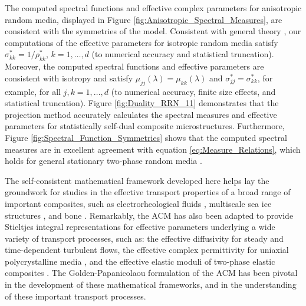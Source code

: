\documentclass{cmslatex}
\renewcommand{\theequation}{\arabic{section}.\arabic{equation}}
\begin{document}
The computed spectral functions and effective complex parameters for
anisotropic random media, displayed in Figure
\ref{fig:Anisotropic_Spectral_Measures},  are consistent with the
symmetries of the model. Consistent with general theory
\cite{MILTON:2002:TC}, our computations of the effective parameters
for isotropic random media 
satisfy $\sigma^*_{kk}=1/\rho^*_{kk}$, $k=1,\ldots,d$ (to numerical accuracy and
statistical truncation). Moreover, the computed spectral functions and
effective parameters are consistent with isotropy and satisfy
$\mu_{jj}(\lambda)=\mu_{kk}(\lambda)$ and $\sigma^*_{jj}=\sigma^*_{kk}$, for example, for all
$j,k=1,\ldots,d$ (to numerical accuracy, finite size effects, and
statistical truncation). Figure
\ref{fig:Duality_RRN_11} demonstrates that the projection method
accurately calculates the spectral measures and 
effective parameters for statistically self-dual composite
microstructures. Furthermore, Figure
\ref{fig:Spectral_Function_Symmetries} shows that the computed 
spectral measures are in excellent agreement with equation
\eqref{eq:Measure_Relations}, which holds for general stationary
two-phase random media \cite{Murphy:JMP:063506}. 



The self-consistent mathematical framework developed here helps lay
the groundwork for studies in the effective transport properties of a
broad range of important composites, such as electrorheological
fluids \cite{Murphy_Thermo_Stat_Mech}, multiscale sea ice structures
\cite{Murphy_Multiscale_Sea_Ice}, and bone
\cite{Golden:JBM:337}. Remarkably, the ACM  has also been
adapted to provide Stieltjes integral representations for 
effective parameters underlying a wide variety of transport processes,
such as: the effective diffusivity for steady
\cite{McLaughlin:SIAM_JAM:780,Avellaneda:CMP-339,Murphy_Advective_Diffusion}
and time-dependent \cite{Avellaneda:PRE:3249} turbulent flows, the
effective complex permittivity for uniaxial polycrystalline media 
\cite{Barabash:JPCM:10323,Gully_Golden_Polycrystalline}, and the
effective elastic moduli of two-phase elastic composites
\cite{Ou:2012:411,Ou:MMAS:655}. The Golden-Papanicolaou formulation of
the ACM has been pivotal in the development of these mathematical
frameworks, and in the understanding of these important transport
processes. 



  \setcounter{equation}{1}  %
  \setcounter{section}{0}  %
  \renewcommand{\theequation}{A-\arabic{equation}}
\renewcommand{\thesection}{A-\arabic{section}}
\end{document}
